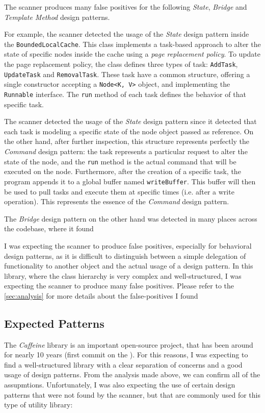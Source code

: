 The scanner produces many false positives for the following \textit{State}, \textit{Bridge} and \textit{Template Method} design patterns.

For example, the scanner detected the usage of the \textit{State} design pattern inside the \texttt{BoundedLocalCache}. This class implements a task-based approach to alter the state of specific nodes inside the cache using a \textit{page replacement policy}. To update the page replacement policy, the class defines three types of task: \texttt{AddTask}, \texttt{UpdateTask} and \texttt{RemovalTask}. These task have a common structure, offering a single constructor accepting a \texttt{Node<K, V>} object, and implementing the \texttt{Runnable} interface. The \texttt{run} method of each task defines the behavior of that specific task.

The scanner detected the usage of the \textit{State} design pattern since it detected that each task is modeling a specific state of the node object passed as reference. On the other hand, after further inspection, this structure represents perfectly the \textit{Command} design pattern: the task represents a particular request to alter the state of the node, and the \texttt{run} method is the actual command that will be executed on the node. Furthermore, after the creation of a specific task, the program appends it to a global buffer named \texttt{writeBuffer}. This buffer will then be used to pull tasks and execute them at specific times (i.e. after a write operation). This represents the essence of the \textit{Command} design pattern.

The \textit{Bridge} design pattern on the other hand was detected in many places across the codebase, where it found

I was expecting the scanner to produce false positives, especially for behavioral design patterns, as it is difficult to distinguish between a simple delegation of functionality to another object and the actual usage of a design pattern. In this library, where the class hierarchy is very complex and well-structured, I was expecting the scanner to produce many false positives. Please refer to the \autoref{sec:analysis} for more details about the false-positives I found

\subsection{Expected Patterns}

The \textit{Caffeine} library is an important open-source project, that has been around for nearly 10 years (first commit on the ). For this reasons, I was expecting to find a well-structured library with a clear separation of concerns and a good usage of design patterns. From the analysis made above, we can confirm all of the assupmtions. Unfortunately, I was also expecting the use of certain design patterns that were not found by the scanner, but that are commonly used for this type of utility library:

